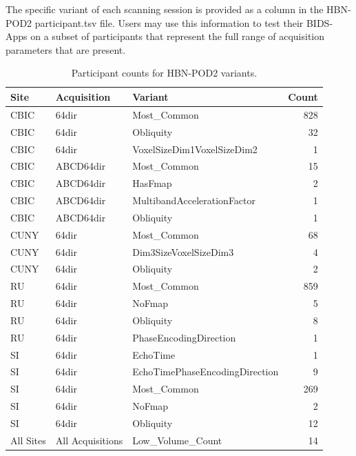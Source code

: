 \documentclass[fleqn,10pt,inline]{wlscirep}
\begin{document}
The specific variant of each scanning session is provided as a column in the HBN-POD2 participant.tsv file. 
Users may use this information to test their BIDS-Apps on a subset of participants that represent the full range of acquisition parameters that are present.

\begin{table}[htbp]
\centering
\begin{tabular}{lllr}
\toprule
     Site &      Acquisition &                        Variant &  Count \\
\midrule
     CBIC &            64dir &                    Most\_Common &    828 \\
     CBIC &            64dir &                      Obliquity &     32 \\
     CBIC &            64dir &     VoxelSizeDim1VoxelSizeDim2 &      1 \\
     CBIC &        ABCD64dir &                    Most\_Common &     15 \\
     CBIC &        ABCD64dir &                        HasFmap &      2 \\
     CBIC &        ABCD64dir &    MultibandAccelerationFactor &      1 \\
     CBIC &        ABCD64dir &                      Obliquity &      1 \\
     CUNY &            64dir &                    Most\_Common &     68 \\
     CUNY &            64dir &          Dim3SizeVoxelSizeDim3 &      4 \\
     CUNY &            64dir &                      Obliquity &      2 \\
       RU &            64dir &                    Most\_Common &    859 \\
       RU &            64dir &                         NoFmap &      5 \\
       RU &            64dir &                      Obliquity &      8 \\
       RU &            64dir &         PhaseEncodingDirection &      1 \\
       SI &            64dir &                       EchoTime &      1 \\
       SI &            64dir & EchoTimePhaseEncodingDirection &      9 \\
       SI &            64dir &                    Most\_Common &    269 \\
       SI &            64dir &                         NoFmap &      2 \\
       SI &            64dir &                      Obliquity &     12 \\
All Sites & All Acquisitions &               Low\_Volume\_Count &     14 \\
\bottomrule
\end{tabular}
\caption{%
  Participant counts for HBN-POD2 variants.
  \label{tab:variants}
}
\end{table}
\end{document}
